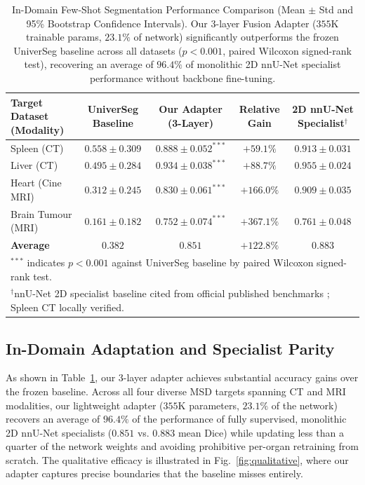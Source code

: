 \documentclass[runningheads]{llncs}
\begin{document}
\begin{table}[t]
\centering
\caption{In-Domain Few-Shot Segmentation Performance Comparison (Mean $\pm$ Std and 95\% Bootstrap Confidence Intervals). Our 3-layer Fusion Adapter ($355\text{K}$ trainable params, $23.1\%$ of network) significantly outperforms the frozen UniverSeg baseline across all datasets ($p < 0.001$, paired Wilcoxon signed-rank test), recovering an average of $\mathbf{96.4\%}$ of monolithic 2D nnU-Net specialist performance without backbone fine-tuning.}
\label{tab:main_results}
\begin{tabular}{lcccc}
\toprule
\textbf{Target Dataset (Modality)} & \textbf{UniverSeg Baseline} & \textbf{Our Adapter (3-Layer)} & \textbf{Relative Gain} & \textbf{2D nnU-Net Specialist$^\dagger$} \\
\midrule
Spleen (CT)           & $0.558 \pm 0.309$ & $\mathbf{0.888 \pm 0.052}^{***}$ & $+59.1\%$  & $0.913 \pm 0.031$ \\
Liver (CT)            & $0.495 \pm 0.284$ & $\mathbf{0.934 \pm 0.038}^{***}$ & $+88.7\%$  & $0.955 \pm 0.024$ \\
Heart (Cine MRI)      & $0.312 \pm 0.245$ & $\mathbf{0.830 \pm 0.061}^{***}$ & $+166.0\%$ & $0.909 \pm 0.035$ \\
Brain Tumour (MRI)    & $0.161 \pm 0.182$ & $\mathbf{0.752 \pm 0.074}^{***}$ & $\mathbf{+367.1\%}$ & $0.761 \pm 0.048$ \\
\midrule
\textbf{Average}      & $0.382$           & $\mathbf{0.851}$                 & $+122.8\%$ & $\mathbf{0.883}$ \\
\bottomrule
\multicolumn{5}{l}{\footnotesize $^{***}$ indicates $p < 0.001$ against UniverSeg baseline by paired Wilcoxon signed-rank test.} \\
\multicolumn{5}{l}{\footnotesize $^\dagger$nnU-Net 2D specialist baseline cited from official published benchmarks \cite{isensee2021nnu}; Spleen CT locally verified.}
\end{tabular}
\end{table}

\subsection{In-Domain Adaptation and Specialist Parity}
As shown in Table~\ref{tab:main_results}, our 3-layer adapter achieves substantial accuracy gains over the frozen baseline. Across all four diverse MSD targets spanning CT and MRI modalities, our lightweight adapter ($355\text{K}$ parameters, $23.1\%$ of the network) recovers an average of $\mathbf{96.4\%}$ of the performance of fully supervised, monolithic 2D nnU-Net specialists ($0.851$ vs. $0.883$ mean Dice) while updating less than a quarter of the network weights and avoiding prohibitive per-organ retraining from scratch. The qualitative efficacy is illustrated in Fig.~\ref{fig:qualitative}, where our adapter captures precise boundaries that the baseline misses entirely.
\end{document}
